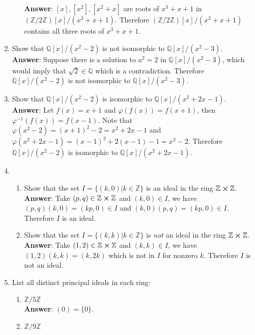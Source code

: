 \documentclass{article}
\begin{document}
\begin{enumerate}
\begin{enumerate}
                        \textbf{Answer}: $[x],[x^2],[x^2+x]$ are roots of $x^3+x+1$ in $(\mathbb{Z}/2\mathbb{Z})[x]/(x^3+x+1)$. Therefore $(\mathbb{Z}/2\mathbb{Z})[x]/(x^3+x+1)$ contains all three roots of $x^3+x+1$.
            \end{enumerate}
      \item Show that $\mathbb{Q}[x]/(x^2-2)$ is not isomorphic to $\mathbb{Q}[x]/(x^2-3)$.\\
            \textbf{Answer}: Suppose there is a solution to $a^2=2$ in $\mathbb{Q}[x]/(x^2-3)$, which would imply that $\sqrt{2}\in\mathbb{Q}$ which is a contradiction. Therefore $\mathbb{Q}[x]/(x^2-2)$ is not isomorphic to $\mathbb{Q}[x]/(x^2-3)$.
      \item Show that $\mathbb{Q}[x]/(x^2-2)$ is isomorphic to $\mathbb{Q}[x]/(x^2+2x-1)$.\\
            \textbf{Answer}: Let $f(x)=x+1$ and $\varphi(f(x))=f(x+1)$, then $\varphi^{-1}(f(x))=f(x-1)$. Note that $\varphi(x^2-2)=(x+1)^2-2=x^2+2x-1$ and $\varphi(x^2+2x-1)=(x-1)^2+2(x-1)-1=x^2-2$. Therefore $\mathbb{Q}[x]/(x^2-2)$ is isomorphic to $\mathbb{Q}[x]/(x^2+2x-1)$.
      \item
            \begin{enumerate}
                  \item Show that the set $I=\{(k,0)|k\in\mathbb{Z}\}$ is an ideal in the ring $\mathbb{Z}\cross\mathbb{Z}$.\\
                        \textbf{Answer}: Take $(p,q)\in\mathbb{Z}\cross\mathbb{Z}$ and $(k,0)\in I$, we have $(p,q)(k,0)=(kp,0)\in I$ and $(k,0)(p,q)=(kp,0)\in I$. Therefore $I$ is an ideal.
                  \item Show that the set $I=\{(k,k)|k\in\mathbb{Z}\}$ is \textit{not} an ideal in the ring $\mathbb{Z}\cross\mathbb{Z}$.\\
                        \textbf{Answer}: Take $(1,2)\in\mathbb{Z}\cross\mathbb{Z}$ and $(k,k)\in I$, we have $(1,2)(k,k)=(k,2k)$ which is not in $I$ for nonzero $k$. Therefore $I$ is not an ideal.
            \end{enumerate}
      \item List all distinct principal ideals in each ring:
            \begin{enumerate}
                  \item $\mathbb{Z}/5\mathbb{Z}$\\
                        \textbf{Answer}: $(0)=\{0\}$.
                  \item $\mathbb{Z}/9\mathbb{Z}$\\

\end{enumerate}
\end{enumerate}
\end{document}
